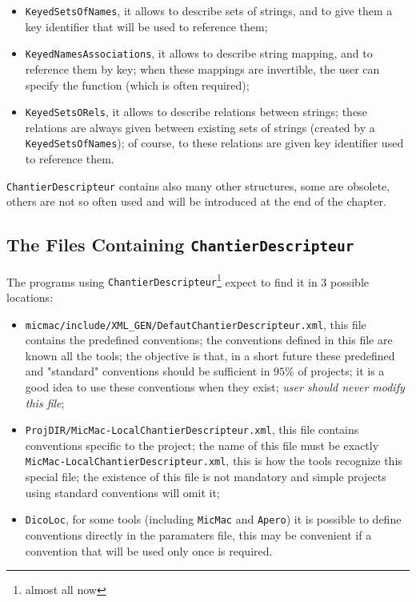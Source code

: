 \begin{itemize}
   \item  {\tt KeyedSetsOfNames}, it allows to describe sets of strings, and to give them
          a key identifier that will be used to reference them;

   \item  {\tt KeyedNamesAssociations}, it allows to describe string mapping,  and
          to reference them by key; when these mappings are invertible, the user can
          specify the  function %
           (which is often required);

   \item  {\tt KeyedSetsORels}, it allows to describe relations between  strings;
          these relations are always given between existing sets of strings
          (created by a {\tt KeyedSetsOfNames}); of course, to these relations are
          given key identifier used to reference them.
\end{itemize}

{\tt ChantierDescripteur} contains also many other structures, some are 
obsolete, others are not so often used and will be introduced at the end of the chapter.


\subsection{The Files Containing {\tt ChantierDescripteur}}

The programs using {\tt ChantierDescripteur}\footnote{almost all now} expect to
find it in 3 possible locations:


\begin{itemize}

   \item {\tt micmac/include/XML\_GEN/DefautChantierDescripteur.xml}, this file contains the
         predefined conventions; the conventions defined in this file are known  all the
         tools; the objective is that, in a short future these predefined and "standard"
         conventions should be sufficient in $95\%$  of projects; it is a good idea
         to use these conventions when they exist; \emph{user should never modify this file};
    

   \item {\tt ProjDIR/MicMac-LocalChantierDescripteur.xml}, this file contains conventions
         specific to the project; the name of this file
         must be exactly {\tt MicMac-LocalChantierDescripteur.xml}, this is how the
         tools recognize this special file; the existence of this file is not mandatory
         and simple projects using standard conventions will  omit it;

   \item {\tt DicoLoc}, for some tools (including {\tt MicMac} and {\tt Apero}) it is possible
         to define conventions directly in the paramaters file, this may be convenient if
         a convention that will be used only once is required.

\end{itemize}

